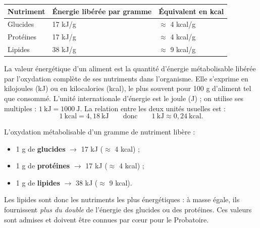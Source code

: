 \documentclass[11pt]{article}
\newcommand{\cle}[1]{{\popxbold\color{popdark}#1}}
\begin{document}
\begin{center}
\begin{tabularx}{\linewidth}{|l|X|X|}
\hline
\rowcolor{popblueL} \textbf{Nutriment} & \textbf{Énergie libérée par gramme} & \textbf{Équivalent en kcal} \\
\hline
Glucides & 17 kJ/g & $\approx$ 4 kcal/g \\
\hline
Protéines & 17 kJ/g & $\approx$ 4 kcal/g \\
\hline
Lipides & 38 kJ/g & $\approx$ 9 kcal/g \\
\hline
\end{tabularx}
\end{center}

\begin{definition}
La \cle{valeur énergétique} d'un aliment est la quantité d'énergie métabolisable libérée par l'oxydation complète de ses nutriments dans l'organisme. Elle s'exprime en \cle{kilojoules} (kJ) ou en \cle{kilocalories} (kcal), le plus souvent pour 100 g d'aliment tel que consommé. L'unité internationale d'énergie est le \cle{joule} (J) ; on utilise ses multiples : $1~\text{kJ} = 1000~\text{J}$. La relation entre les deux unités usuelles est :
\[ 1~\text{kcal} = 4{,}18~\text{kJ} \qquad \text{donc} \qquad 1~\text{kJ} \approx 0{,}24~\text{kcal}. \]
\end{definition}

\begin{propriete}
L'oxydation métabolisable d'un gramme de nutriment libère :
\begin{itemize}
\item 1 g de \textbf{glucides} $\rightarrow$ 17 kJ ($\approx$ 4 kcal) ;
\item 1 g de \textbf{protéines} $\rightarrow$ 17 kJ ($\approx$ 4 kcal) ;
\item 1 g de \textbf{lipides} $\rightarrow$ 38 kJ ($\approx$ 9 kcal).
\end{itemize}
Les \cle{lipides} sont donc les nutriments les plus énergétiques : à masse égale, ils fournissent \emph{plus du double} de l'énergie des glucides ou des protéines. Ces valeurs sont admises et doivent être connues par cœur pour le Probatoire.
\end{propriete}
\end{document}
